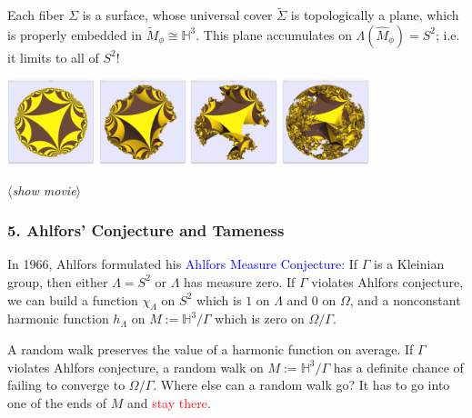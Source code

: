 \documentclass{beamer}
\def\H{\mathbb{H}}
\begin{document}
\frame
{
Each fiber $\Sigma$ is a surface, whose universal cover
$\widetilde{\Sigma}$ is topologically a plane, which is properly embedded in
$\widetilde{M}_\phi\cong \H^3$.  
\vskip 10pt
This plane accumulates on $\Lambda(\widehat{M}_\phi)=S^2$; i.e.\/ it limits to all
of $S^2$!
\begin{center}
\includegraphics[width=1in]{torus_0.png}\hskip 4pt
\includegraphics[width=1in]{torus_12.png}\hskip 4pt
\includegraphics[width=1in]{torus_24.png}\hskip 4pt
\includegraphics[width=1in]{torus_36.png}
\end{center}
\begin{center}$\langle${\sl show movie}$\rangle$\end{center}
}
\frame
{
\frametitle{5. Ahlfors' Conjecture and Tameness}
In 1966, Ahlfors formulated his
\vskip 10pt
\textcolor{blue}{Ahlfors Measure Conjecture:} If $\Gamma$ is a Kleinian group, then either
$\Lambda=S^2$ or $\Lambda$ has measure zero.
\vskip 10pt
If $\Gamma$ violates Ahlfors conjecture, we can build a function $\chi_\Lambda$ on $S^2$
which is $1$ on $\Lambda$ and $0$ on $\Omega$, and a nonconstant harmonic function
$h_\Lambda$ on $M:=\H^3/\Gamma$ which is zero on $\Omega/\Gamma$.
}
\frame
{
A random walk preserves the value of a harmonic function \textcolor{dgreen}{on average}.
If $\Gamma$ violates Ahlfors conjecture, a random walk on $M:=\H^3/\Gamma$ has
a definite chance of failing to converge to $\Omega/\Gamma$.
\vskip 10pt
Where else can a random walk go? It has to go into one of the \textcolor{dgreen}{ends} of $M$
and \textcolor{red}{stay there}.
}
\end{document}
